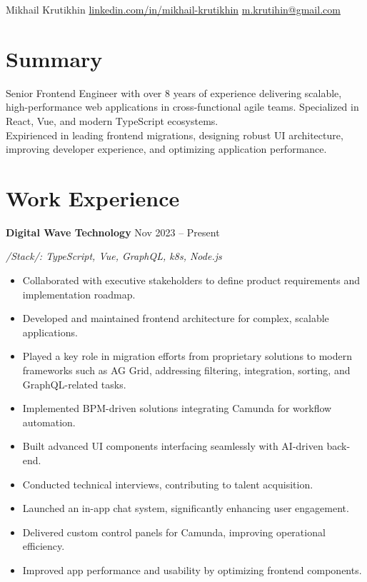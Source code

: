\documentclass[a4paper,9pt]{article}
\begin{document}
\pagestyle{empty}

\begin{center}
    {\Huge Mikhail Krutikhin} \quad
    \href{https://linkedin.com/in/mikhail-krutikhin}{linkedin.com/in/mikhail-krutikhin} \quad
    \href{mailto:m.krutihin@gmail.com}{m.krutihin@gmail.com}
\end{center}

\section{Summary}
Senior Frontend Engineer with over 8 years of experience delivering scalable, high-performance web applications in cross-functional agile teams. Specialized in React, Vue, and modern TypeScript ecosystems.\\

Expirienced in leading frontend migrations, designing robust UI architecture, improving developer experience, and optimizing application performance.
\section{Work Experience}

\textbf{Digital Wave Technology} \hfill Nov 2023 -- Present

\textit{/Stack/: TypeScript, Vue, GraphQL, k8s, Node.js}
\begin{itemize}[leftmargin=*]
  \item Collaborated with executive stakeholders to define product requirements and implementation roadmap.
  \item Developed and maintained frontend architecture for complex, scalable applications.
  \item Played a key role in migration efforts from proprietary solutions to modern frameworks such as AG Grid, addressing filtering, integration, sorting, and GraphQL-related tasks.
  \item Implemented BPM-driven solutions integrating Camunda for workflow automation.
  \item Built advanced UI components interfacing seamlessly with AI-driven back-end.
  \item Conducted technical interviews, contributing to talent acquisition.
  \item Launched an in-app chat system, significantly enhancing user engagement.
  \item Delivered custom control panels for Camunda, improving operational efficiency.
  \item Improved app performance and usability by optimizing frontend components.
\end{itemize}
\vspace{6pt}
\end{document}
